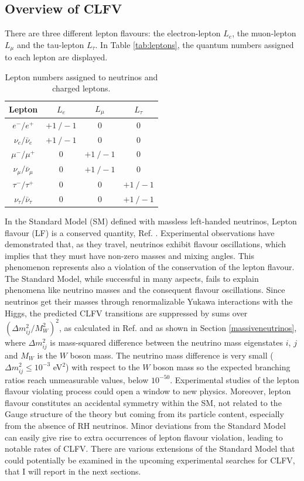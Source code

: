 \subsection{Overview of CLFV}
There are three different lepton flavours: the electron-lepton $L_e$, the muon-lepton $L_{\mu}$ and the tau-lepton $L_{\tau}$. In Table \ref{tab:leptons}, the quantum numbers assigned to each lepton are displayed.
 \begin{center}  
\begin{table}[!h]
\centering
\renewcommand{\arraystretch}{1.5}
\begin{tabular}{c c c c}
\hline
Lepton & $L_e$ & $L_{\mu}$ & $L_{\tau}$\\
\hline
$e^-/e^+$ & $+1 \ /-1$ & 0 & 0 \\
$\nu_{e}/\bar{\nu}_{e}$ & $+1 \ /-1$ & 0 & 0 \\
$\mu^-/\mu^+$ & 0 & $+1 \ /-1$ & 0 \\
$\nu_{\mu}/\bar{\nu}_{\mu}$ & 0 & $+1 \ /-1$ & 0 \\
$\tau^-/\tau^+$ & 0 & 0 & $+1 \ /-1$\\
$\nu_{\tau}/\bar{\nu}_{\tau}$ & 0 & 0 & $+1 \ /-1$ \\
\hline
\end{tabular}
\caption{Lepton numbers assigned to neutrinos and charged leptons.}
\end{table}\label{tab:leptons}
\end{center}
In the Standard Model (SM) defined with massless left-handed neutrinos, Lepton flavour (LF) is a conserved quantity, Ref. \cite{universe8060299}. Experimental observations have demonstrated that, as they travel, neutrinos exhibit flavour oscillations, which implies that they must have non-zero masses and mixing angles. This phenomenon represents also a violation of the conservation of the lepton flavour. The Standard Model, while successful in many aspects, fails to explain phenomena like neutrino masses and the consequent flavour oscillations. Since neutrinos get their masses through renormalizable Yukawa interactions
with the Higgs, the predicted CLFV transitions are suppressed by sums over $(\Delta m^2_{i j}/M^2 _W)^2$, as calculated in Ref. \cite{MARCIANO1977303} and as shown in Section \ref{massiveneutrinos}, where $\Delta m^2_{ij}$ is mass-squared difference between the neutrino mass eigenstates $i$, $j$ and $M_W$ is the $W$ boson mass. The neutrino mass difference is very small ($\Delta m^2 _{i j} \leq 10^{-3}$ eV$^2$) with respect to the $W$ boson mass so the expected branching ratios reach unmeasurable values, below $10^{-50}$. Experimental studies of the lepton flavour violating process could open a window to new physics. Moreover, lepton flavour constitutes an accidental symmetry within the SM, not related to the Gauge structure of the theory but coming
from its particle content, especially from the absence of RH neutrinos. Minor deviations from the Standard Model can easily give rise to extra occurrences of lepton flavour violation, leading to notable rates of CLFV.
There are various extensions of the Standard Model that could potentially be examined in the upcoming experimental searches for CLFV, that I will report in the next sections.
